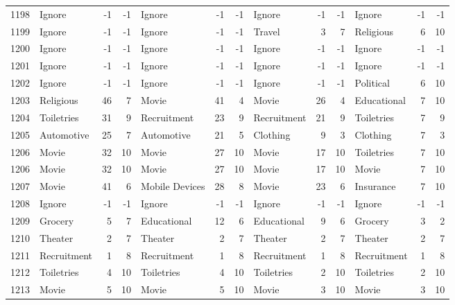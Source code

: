 \begin{figure}[htbp]
\begin{tabular}{rlrrlrrlrrlrr}
    1198  & Ignore & -1    & -1    & Ignore & -1    & -1    & Ignore & -1    & -1    & Ignore & -1    & -1 \\
    1199  & Ignore & -1    & -1    & Ignore & -1    & -1    & Travel & 3     & 7     & Religious & 6     & 10 \\
    1200  & Ignore & -1    & -1    & Ignore & -1    & -1    & Ignore & -1    & -1    & Ignore & -1    & -1 \\
    1201  & Ignore & -1    & -1    & Ignore & -1    & -1    & Ignore & -1    & -1    & Ignore & -1    & -1 \\
    1202  & Ignore & -1    & -1    & Ignore & -1    & -1    & Ignore & -1    & -1    & Political & 6     & 10 \\
    1203  & Religious & 46    & 7     & Movie & 41    & 4     & Movie & 26    & 4     & Educational & 7     & 10 \\
    1204  & Toiletries & 31    & 9     & Recruitment & 23    & 9     & Recruitment & 21    & 9     & Toiletries & 7     & 9 \\
    1205  & Automotive & 25    & 7     & Automotive & 21    & 5     & Clothing & 9     & 3     & Clothing & 7     & 3 \\
    1206  & Movie & 32    & 10    & Movie & 27    & 10    & Movie & 17    & 10    & Toiletries & 7     & 10 \\
    1206  & Movie & 32    & 10    & Movie & 27    & 10    & Movie & 17    & 10    & Movie & 7     & 10 \\
    1207  & Movie & 41    & 6     & Mobile Devices & 28    & 8     & Movie & 23    & 6     & Insurance & 7     & 10 \\
    1208  & Ignore & -1    & -1    & Ignore & -1    & -1    & Ignore & -1    & -1    & Ignore & -1    & -1 \\
    1209  & Grocery & 5     & 7     & Educational & 12    & 6     & Educational & 9     & 6     & Grocery & 3     & 2 \\
    1210  & Theater & 2     & 7     & Theater & 2     & 7     & Theater & 2     & 7     & Theater & 2     & 7 \\
    1211  & Recruitment & 1     & 8     & Recruitment & 1     & 8     & Recruitment & 1     & 8     & Recruitment & 1     & 8 \\
    1212  & Toiletries & 4     & 10    & Toiletries & 4     & 10    & Toiletries & 2     & 10    & Toiletries & 2     & 10 \\
    1213  & Movie & 5     & 10    & Movie & 5     & 10    & Movie & 3     & 10    & Movie & 3     & 10 \\

\end{tabular}
\end{figure}
